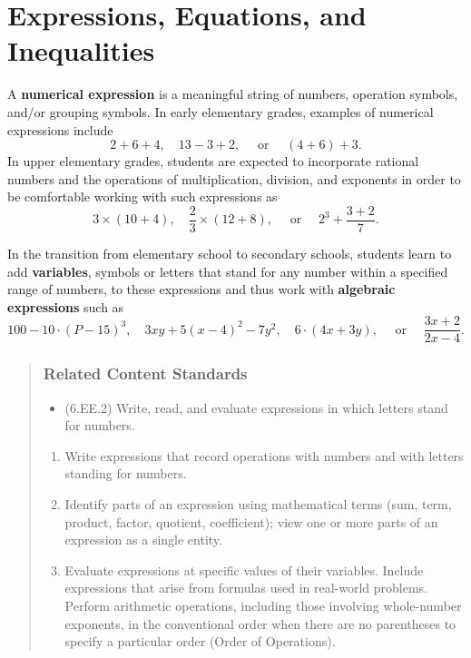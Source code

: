 \documentclass[
]{book}
\providecommand{\tightlist}{%
  \setlength{\itemsep}{0pt}\setlength{\parskip}{0pt}}
\theoremstyle{definition}
\theoremstyle{definition}
\theoremstyle{definition}
\theoremstyle{remark}
\begin{document}
\hypertarget{expressions-equations-and-inequalities}{%
\section{Expressions, Equations, and Inequalities}\label{expressions-equations-and-inequalities}}

A \textbf{numerical expression} is a meaningful string of numbers, operation symbols, and/or grouping symbols. In early elementary grades, examples of numerical expressions include \[2+6+4, \quad 13-3+2, \quad \mbox{ or } \quad (4+6)+3.\] In upper elementary grades, students are expected to incorporate rational numbers and the operations of multiplication, division, and exponents in order to be comfortable working with such expressions as
\[3 \times (10+4), \quad \frac{2}{3} \times (12+8), \quad \mbox{ or } \quad  2^3 + \frac{3+2}{7}.\]

In the transition from elementary school to secondary schools, students learn to add \textbf{variables}, symbols or letters that stand for any number within a specified range of numbers, to these expressions and thus work with \textbf{algebraic expressions} such as
\[100-10\cdot (P-15)^3,  \quad 3xy + 5(x-4)^2-7y^2, \quad 6\cdot (4x+3y), \quad \mbox{ or }\quad  \frac{3x+2}{2x-4}.\]

\begin{quote}
\hypertarget{related-content-standards-4}{%
\subsubsection*{Related Content Standards}\label{related-content-standards-4}}

\begin{itemize}
\tightlist
\item
  (6.EE.2) Write, read, and evaluate expressions in which letters stand for numbers.
\end{itemize}

\begin{enumerate}
\def\labelenumi{\alph{enumi}.}
\tightlist
\item
  Write expressions that record operations with numbers and with letters standing for numbers.
\item
  Identify parts of an expression using mathematical terms (sum, term, product, factor, quotient, coefficient); view one or more parts of an expression as a single entity.
\item
  Evaluate expressions at specific values of their variables. Include expressions that arise from formulas used in real-world problems. Perform arithmetic operations, including those involving whole-number exponents, in the conventional order when there are no parentheses to specify a particular order (Order of Operations).
\end{enumerate}
\end{quote}
\end{document}
